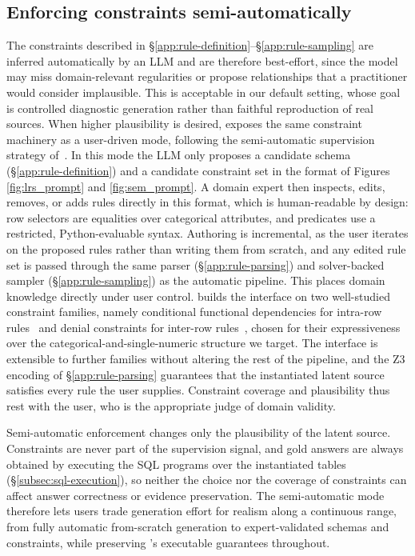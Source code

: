 \subsection{Enforcing constraints semi-automatically}
\label{app:real-constraint}

The constraints described in \S\ref{app:rule-definition}–\S\ref{app:rule-sampling} are inferred automatically by an LLM and are therefore best-effort, since the model may miss domain-relevant regularities or propose relationships that a practitioner would consider implausible. This is acceptable in our default setting, whose goal is controlled diagnostic generation rather than faithful reproduction of real sources. When higher plausibility is desired, \name{} exposes the same constraint machinery as a user-driven mode, following the semi-automatic supervision strategy of~\citet{5.12}.
In this mode the LLM only proposes a candidate schema (\S\ref{app:rule-definition}) and a candidate constraint set in the format of Figures \ref{fig:lrs_prompt} and \ref{fig:sem_prompt}. A domain expert then inspects, edits, removes, or adds rules directly in this format, which is human-readable by design: row selectors are equalities over categorical attributes, and predicates use a restricted, Python-evaluable syntax. Authoring is incremental, as the user iterates on the proposed rules rather than writing them from scratch, and any edited rule set is passed through the same parser (\S\ref{app:rule-parsing}) and solver-backed sampler (\S\ref{app:rule-sampling}) as the automatic pipeline.
This places domain knowledge directly under user control. \name{} builds the interface on two well-studied constraint families, namely conditional functional dependencies for intra-row rules~\cite{cfd} and denial constraints for inter-row rules~\cite{dc}, chosen for their expressiveness over the categorical-and-single-numeric structure we target. The interface is extensible to further families without altering the rest of the pipeline, and the Z3 encoding of \S\ref{app:rule-parsing} guarantees that the instantiated latent source satisfies every rule the user supplies. Constraint coverage and plausibility thus rest with the user, who is the appropriate judge of domain validity.

Semi-automatic enforcement changes only the plausibility of the latent source. Constraints are never part of the supervision signal, and gold answers are always obtained by executing the SQL programs over the instantiated tables (\S\ref{subsec:sql-execution}), so neither the choice nor the coverage of constraints can affect answer correctness or evidence preservation. The semi-automatic mode therefore lets users trade generation effort for realism along a continuous range, from fully automatic from-scratch generation to expert-validated schemas and constraints, while preserving \name's executable guarantees throughout.

